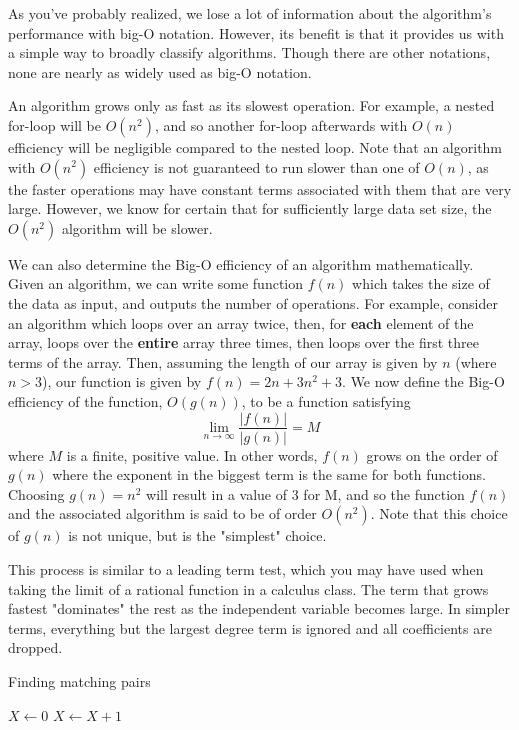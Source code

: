 As you've probably realized, we lose a lot of information about the algorithm's performance with big-O notation. However, its benefit is that it provides us with a simple way to broadly classify algorithms. Though there are other notations, none are nearly as widely used as big-O notation.

An algorithm grows only as fast as its slowest operation.  For example, a nested for-loop will be $ O(n^2) $, and so another for-loop afterwards with $ O(n) $ efficiency will be negligible compared to the nested loop.  Note that an algorithm with $ O(n^2) $ efficiency is not guaranteed to run slower than one of $ O(n) $, as the faster operations may have constant terms associated with them that are very large.  However, we know for certain that for sufficiently large data set size, the $ O(n^2) $ algorithm will be slower.

We can also determine the Big-O efficiency of an algorithm mathematically.  Given an algorithm, we can write some function $ f(n) $ which takes the size of the data as input, and outputs the number of operations.  For example, consider an algorithm which loops over an array twice, then, for \textbf{each} element of the array, loops over the \textbf{entire} array three times, then loops over the first three terms of the array.  Then, assuming the length of our array is given by $ n $ (where $ n > 3 $), our function is given by $ f(n) = 2n + 3n^2 + 3 $.  We now define the Big-O efficiency of the function, $ O(g(n)) $, to be a function satisfying
$$ \lim_{n \to \infty}{\frac{|f(n)|}{|g(n)|}} = M $$ 
where $ M $ is a finite, positive value.  In other words, $ f(n) $ grows on the order of $ g(n) $ where the exponent in the biggest term is the same for both functions.  Choosing $ g(n) = n^2 $ will result in a value of $ 3 $ for M, and so the function $ f(n) $ and the associated algorithm is said to be of order $ O(n^2) $.  Note that this choice of $ g(n) $ is not unique, but is the "simplest" choice.

This process is similar to a leading term test, which you may have used when taking the limit of a rational function in a calculus class. The term that grows fastest "dominates" the rest as the independent variable becomes large. In simpler terms, everything but the largest degree term is ignored and all coefficients are dropped.

\begin{algorithm}[H]
\caption{Finding matching pairs}
\begin{algorithmic}
\State $ X \gets 0 $
            \State $X \gets X + 1$
        \EndIf
    \EndFor
\EndFor
\end{algorithmic}
\end{algorithm}

